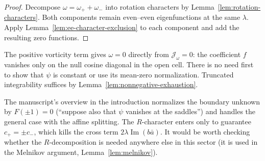 \begin{proof}
\leanok
Decompose $\omega=\omega_++\omega_-$ into rotation characters by
Lemma~\ref{lem:rotation-characters}. Both components remain even--even eigenfunctions
at the same $\lambda$. Apply Lemma~\ref{lem:ee-character-exclusion} to each component
and add the resulting zero functions.
\end{proof}

\begin{remark}
The positive vorticity term gives $\omega=0$ directly from
$\mathcal J_\omega=0$: the coefficient $f$ vanishes only on the null
cosine diagonal in the open cell. There is no need first to show that
$\psi$ is constant or use its mean-zero normalization. Truncated
integrability suffices by Lemma~\ref{lem:nonnegative-exhaustion}.
\end{remark}

\begin{remark}
The manuscript's overview in the introduction normalizes the boundary
unknown by $F(\pm1)=0$ (``suppose also that $\psi$ vanishes at the
saddles'') and handles the general case with the affine splitting. The
$R$-character enters only to guarantee $c_+=\pm c_-$, which kills the cross
term $2\lambda\operatorname{Im}(b\bar a)$. It would be worth checking whether
the $R$-decomposition is needed anywhere else in this sector (it is used in
the Melnikov argument, Lemma~\ref{lem:melnikov}).
\end{remark}
